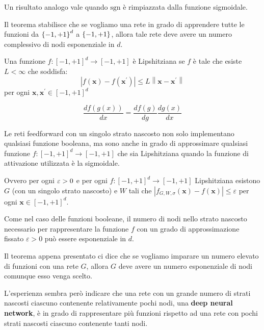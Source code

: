 \documentclass[\main/main.tex]{subfiles}
\begin{document}
\begin{multicols}{2}
\begin{theorem}
    Un risultato analogo vale quando \(\mathrm{sgn}\) è rimpiazzata dalla funzione sigmoidale.

    Il teorema stabilisce che se vogliamo una rete in grado di apprendere tutte le funzioni da \(\left\{-1, +1\right\}^d\) a \(\left\{-1, +1\right\}\), allora tale rete deve avere un numero complessivo di nodi esponenziale in \(d\).
\end{theorem}
\begin{definition}
    Una funzione \(f :[-1,+1]^{d} \rightarrow[-1,+1]\) è Lipshitziana se \(f\) è tale che esiste \(L < \infty\) che soddisfa:
    \[\left|f(\boldsymbol{x})-f\left(\boldsymbol{x}^{\prime}\right)\right| \leq L\left\|\boldsymbol{x}-\boldsymbol{x}^{\prime}\right\|\]
    per ogni \(\boldsymbol{x}, \boldsymbol{x}^{\prime} \in[-1,+1]^{d}\)
\end{definition}
\begin{definition}
    \[\frac{d f(g(x))}{d x}=\frac{d f(g)}{d g} \frac{d g(x)}{d x}\]
\end{definition}
\begin{observation}
    Le reti feedforward con un singolo strato nascosto non solo implementano qualsiasi funzione booleana, ma sono anche in grado di approssimare qualsiasi funzione \(f :[-1,+1]^{d} \rightarrow[-1,+1]\) che sia Lipshitziana quando la funzione di attivazione utilizzata è la sigmoidale.
    
    Ovvero per ogni \(\varepsilon>0\) e per ogni \(f :[-1,+1]^{d} \rightarrow[-1,+1]\) Lipshitziana esistono \(G\) (con un singolo strato nascosto) e \(W\) tali che \(\left|f_{G, W, \sigma}(\boldsymbol{x})-f(\boldsymbol{x})\right| \leq \varepsilon\) per ogni \(\boldsymbol{x} \in[-1,+1]^{d}\).
    
    Come nel caso delle funzioni booleane, il numero di nodi nello strato nascosto necessario per rappresentare la funzione \(f\) con un grado di approssimazione fissato \(\varepsilon > 0\) può essere esponenziale in \(d\).
\end{observation}
\begin{observation}
    Il teorema appena presentato ci dice che se vogliamo imparare un numero elevato di funzioni con una rete \(G\), allora \(G\) deve avere un numero esponenziale di nodi comunque esso venga scelto.
    
    L'esperienza sembra però indicare che una rete con un grande numero di strati nascosti ciascuno contenente relativamente pochi nodi, una \textbf{deep neural network}, è in grado di rappresentare più funzioni rispetto ad una rete con pochi strati nascosti ciascuno contenente tanti nodi.
    

\end{observation}
\end{multicols}
\end{document}
